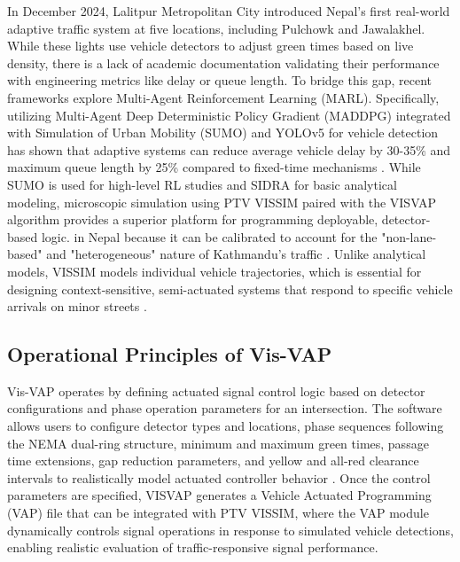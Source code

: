 In December 2024, Lalitpur Metropolitan City introduced Nepal's first real-world adaptive traffic system at five locations, including Pulchowk and Jawalakhel. 
While these lights use vehicle detectors to adjust green times based on live density, there is a lack of academic documentation validating their performance with 
engineering metrics like delay or queue length. To bridge this gap, recent frameworks explore Multi-Agent Reinforcement Learning (MARL). Specifically, utilizing 
Multi-Agent Deep Deterministic Policy Gradient (MADDPG) integrated with Simulation of Urban Mobility (SUMO) and YOLOv5 for vehicle detection has shown that adaptive 
systems can reduce average vehicle delay by 30-35\% and maximum queue length by 25\% compared to fixed-time mechanisms \cite{maharjan2025leveraging}. While SUMO is 
used for high-level RL studies and SIDRA for basic analytical modeling, microscopic simulation using PTV VISSIM paired with the VISVAP algorithm provides a superior 
platform for programming deployable, detector-based logic. in Nepal because it can be calibrated to account for the "non-lane-based" and "heterogeneous" nature of 
Kathmandu's traffic \cite{manandhar2023calibration}. Unlike analytical models, VISSIM models individual vehicle trajectories, which is essential for designing context-sensitive, 
semi-actuated systems that respond to specific vehicle arrivals on minor streets \cite{afshari2025calibrating}. 

\subsection{Operational Principles of Vis-VAP}

Vis-VAP operates by defining actuated signal control logic based on 
detector configurations and phase operation parameters for an 
intersection. The software allows users to configure detector types 
and locations, phase sequences following the NEMA dual-ring 
structure, minimum and maximum green times, passage time extensions, 
gap reduction parameters, and yellow and all-red clearance 
intervals to realistically model actuated controller behavior 
\cite{ptv2022vissim}. Once the control parameters are specified, 
VISVAP generates a Vehicle Actuated Programming (VAP) file that 
can be integrated with PTV VISSIM, where the VAP module dynamically 
controls signal operations in response to simulated vehicle 
detections, enabling realistic evaluation of traffic-responsive 
signal performance\cite{fellendorf2010vissim}.



